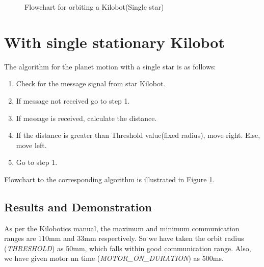 \documentclass{report}[12pt]
\begin{document}
\begin{figure}[H]
	\centering
	\caption{Flowchart for orbiting a Kilobot(Single star)}
	\label{fig:Flowchart_for_orbiting_a_Kilobot(Single_star)}
\end{figure}

\section{With single stationary Kilobot}
The algorithm for the planet motion with a single star is as follows:
\begin{enumerate}
    \item Check for the message signal from star Kilobot.
    \item If message not received go to step 1.
    \item If message is received, calculate the distance.
    \item If the distance is greater than Threshold value(fixed radius), move right. Else, move left.
    \item Go to step 1.
\end{enumerate}

Flowchart to the corresponding algorithm is illustrated in Figure \ref{fig:Flowchart_for_orbiting_a_Kilobot(Single_star)}.

\subsection{Results and Demonstration}
As per the Kilobotics manual, the maximum and minimum communication ranges are 110mm and 33mm respectively. So we have taken the orbit radius ({\it THRESHOLD}) as 50mm, which falls within good communication range. Also, we have given motor nn time ({\it MOTOR\_ON\_DURATION}) as 500ms.
\end{document}
